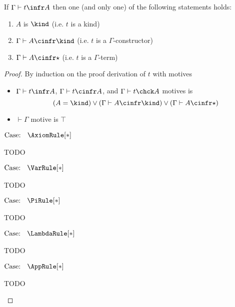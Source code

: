 
\begin{theorem}[Classification]
    If $\Gamma \vdash t \infr A$ then one (and only one) of the following statements holds:
    \begin{enumerate}
        \item $A$ is $\kind$ (i.e. $t$ is a kind)
        \item $\Gamma \vdash A \cinfr \kind$ (i.e. $t$ is a $\Gamma$-constructor)
        \item $\Gamma \vdash A \cinfr \star$ (i.e. $t$ is a $\Gamma$-term)
    \end{enumerate}
\end{theorem}
\begin{proof}
    By induction on the proof derivation of $t$ with motives
    \begin{itemize}
        \item {
            $\Gamma \vdash t \infr A$, $\Gamma \vdash t \cinfr A$, and $\Gamma \vdash t \chck A$ motives is
            $$(A = \kind) \vee (\Gamma \vdash A \cinfr \kind) \vee (\Gamma \vdash A \cinfr \star)$$
        }
        \item {
            $\vdash \Gamma$ motive is $\top$
        }
    \end{itemize}

$\text{Case: }\begin{array}{c} \AxiomRule[*] \end{array}$
\begin{proofcase}
    TODO
\end{proofcase}

$\text{Case: }\begin{array}{c} \VarRule[*] \end{array}$
\begin{proofcase}
    TODO
\end{proofcase}

$\text{Case: }\begin{array}{c} \PiRule[*] \end{array}$
\begin{proofcase}
    TODO
\end{proofcase}

$\text{Case: }\begin{array}{c} \LambdaRule[*] \end{array}$
\begin{proofcase}
    TODO
\end{proofcase}

$\text{Case: }\begin{array}{c} \AppRule[*] \end{array}$
\begin{proofcase}
    TODO
\end{proofcase}


\end{proof}
